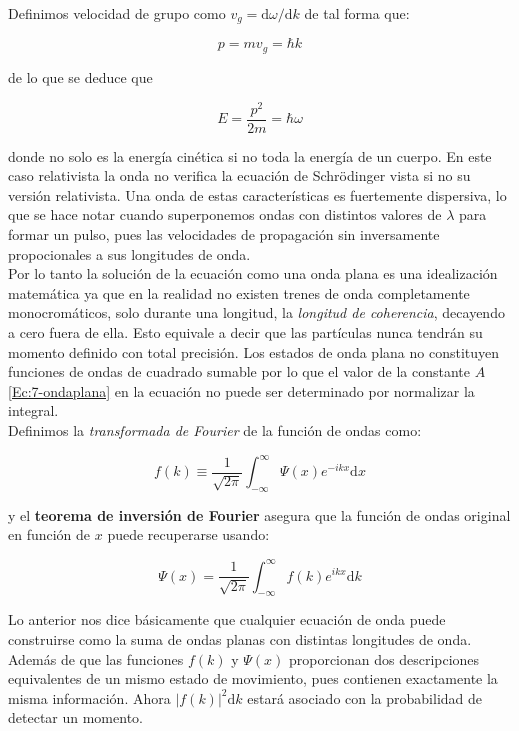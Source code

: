 \documentclass[12pt]{article}
\newcommand{\D}{\mathrm{d}}
\newcommand{\intf}{\int_{-\infty}^{\infty}}
\begin{document}
Definimos velocidad de grupo como $ v_g = \D \omega / \D k$ de tal forma que:

\begin{equation}
p = m v_g = \hbar k
\end{equation}

de lo que se deduce que

\begin{equation}
E = \dfrac{p^2}{2m} = \hbar \omega
\end{equation}

donde no solo es la energía cinética si no toda la energía de un cuerpo. En este caso relativista la onda no verifica la ecuación de Schrödinger vista si no su versión relativista. Una onda de estas características es fuertemente dispersiva, lo que se hace notar cuando superponemos ondas con distintos valores de $\lambda$ para formar un pulso, pues las velocidades de propagación sin inversamente propocionales a sus longitudes de onda. \\

Por lo tanto la solución de la ecuación como una onda plana es una idealización matemática ya que en la realidad no existen trenes de onda completamente monocromáticos, solo durante una longitud, la \textit{longitud de coherencia}, decayendo a cero fuera de ella. Esto equivale a decir que las partículas nunca tendrán su momento definido con total precisión. Los estados de onda plana no constituyen funciones de ondas de cuadrado sumable por lo que el valor de la constante $A$ \ref{Ec:7-ondaplana} en la ecuación no puede ser determinado por normalizar la integral. \\

Definimos la \textit{transformada de Fourier} de la función de ondas como:

\begin{equation}
f(k) \equiv \dfrac{1}{\sqrt{2 \pi}} \intf \Psi (x) e^{-ikx} \D x
\end{equation}

y el \textbf{teorema de inversión de Fourier} asegura que la función de ondas original en función de $x$ puede recuperarse usando:

\begin{equation}
\Psi (x) = \dfrac{1}{\sqrt{2 \pi}} \int_{-\infty}^{\infty} f(k) e^{ikx} \D k
\end{equation}

Lo anterior nos dice básicamente que cualquier ecuación de onda puede construirse como la suma de ondas planas con distintas longitudes de onda. Además de que las funciones $f(k)$ y $\Psi (x)$ proporcionan dos descripciones equivalentes de un mismo estado de movimiento, pues contienen exactamente la misma información. Ahora $|f(k)|^2 \D k$ estará asociado con la probabilidad de detectar un momento.
\end{document}
